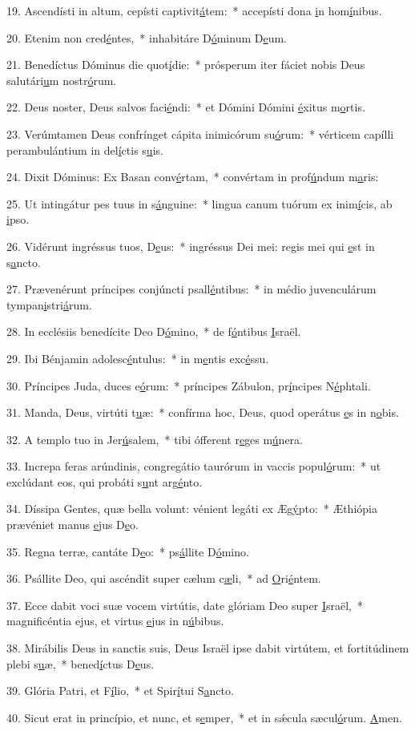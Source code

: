 19. Ascendísti in altum, cepísti captivit\uline{á}tem:~* accepísti dona \uline{i}n hom\uline{í}nibus.\par 
20. Etenim non cred\uline{é}ntes,~* inhabitáre D\uline{ó}minum D\uline{e}um.\par 
21. Benedíctus Dóminus die quot\uline{í}die:~* prósperum iter fáciet nobis Deus salutári\uline{u}m nostr\uline{ó}rum.\par 
22. Deus noster, Deus salvos faci\uline{é}ndi:~* et Dómini Dómini \uline{é}xitus m\uline{o}rtis.\par 
23. Verúmtamen Deus confrínget cápita inimicórum su\uline{ó}rum:~* vérticem capílli perambulántium in del\uline{í}ctis s\uline{u}is.\par 
24. Dixit Dóminus: Ex Basan conv\uline{é}rtam,~* convértam in prof\uline{ú}ndum m\uline{a}ris:\par 
25. Ut intingátur pes tuus in s\uline{á}nguine:~* lingua canum tuórum ex inim\uline{í}cis, ab \uline{i}pso.\par 
26. Vidérunt ingréssus tuos, D\uline{e}us:~* ingréssus Dei mei: regis mei qui \uline{e}st in s\uline{a}ncto.\par 
27. Prævenérunt príncipes conjúncti psall\uline{é}ntibus:~* in médio juvenculárum tympan\uline{i}stri\uline{á}rum.\par 
28. In ecclésiis benedícite Deo D\uline{ó}mino,~* de f\uline{ó}ntibus \uline{I}sraël.\par 
29. Ibi Bénjamin adolesc\uline{é}ntulus:~* in m\uline{e}ntis exc\uline{é}ssu.\par 
30. Príncipes Juda, duces e\uline{ó}rum:~* príncipes Zábulon, pr\uline{í}ncipes N\uline{é}phtali.\par 
31. Manda, Deus, virtúti t\uline{u}æ:~* confírma hoc, Deus, quod operátus \uline{e}s in n\uline{o}bis.\par 
32. A templo tuo in Jer\uline{ú}salem,~* tibi ófferent r\uline{e}ges m\uline{ú}nera.\par 
33. Increpa feras arúndinis, congregátio taurórum in vaccis popul\uline{ó}rum:~* ut exclúdant eos, qui probáti s\uline{u}nt arg\uline{é}nto.\par 
34. Díssipa Gentes, quæ bella volunt: vénient legáti ex Æg\uline{ý}pto:~* Æthiópia prævéniet manus \uline{e}jus D\uline{e}o.\par 
35. Regna terræ, cantáte D\uline{e}o:~* ps\uline{á}llite D\uline{ó}mino.\par 
36. Psállite Deo, qui ascéndit super cælum c\uline{æ}li,~* ad \uline{O}ri\uline{é}ntem.\par 
37. Ecce dabit voci suæ vocem virtútis, date glóriam Deo super \uline{I}sraël,~* magnificéntia ejus, et virtus \uline{e}jus in n\uline{ú}bibus.\par 
38. Mirábilis Deus in sanctis suis, Deus Israël ipse dabit virtútem, et fortitúdinem plebi s\uline{u}æ,~* bened\uline{í}ctus D\uline{e}us.\par 
39. Glória Patri, et F\uline{í}lio,~* et Spir\uline{í}tui S\uline{a}ncto.\par 
40. Sicut erat in princípio, et nunc, et s\uline{e}mper,~* et in sǽcula sæcul\uline{ó}rum. \uline{A}men.\par 

